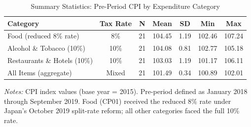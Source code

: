 \begin{table}[htbp]
\centering
\caption{Summary Statistics: Pre-Period CPI by Expenditure Category}
\label{tab:summary}
\begin{tabular}{lcccccc}
\hline\hline
Category & Tax Rate & N & Mean & SD & Min & Max \\
\hline
Food (reduced 8\% rate) & 8\% & 21 & 104.45 & 1.19 & 102.46 & 107.24 \\
Alcohol \& Tobacco (10\%) & 10\% & 21 & 104.08 & 0.81 & 102.77 & 105.18 \\
Restaurants \& Hotels (10\%) & 10\% & 21 & 103.03 & 1.19 & 101.17 & 106.11 \\
All Items (aggregate) & Mixed & 21 & 101.49 & 0.34 & 100.89 & 102.01 \\
\hline\hline
\end{tabular}
\begin{tablenotes}[flushleft]
\small
\item \textit{Notes:} CPI index values (base year = 2015). Pre-period defined as January 2018 through September 2019. Food (CP01) received the reduced 8\% rate under Japan's October 2019 split-rate reform; all other categories faced the full 10\% rate.
\end{tablenotes}
\end{table}
